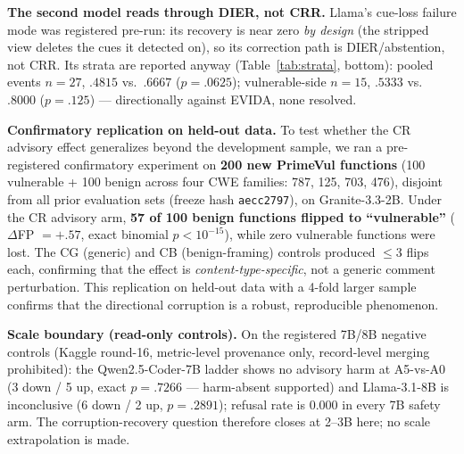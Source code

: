 \documentclass[sigconf,nonacm]{acmart}
\begin{document}
\textbf{The second model reads through DIER, not CRR.} Llama's cue-loss
failure mode was registered pre-run: its recovery is near zero \emph{by
design} (the stripped view deletes the cues it detected on), so its
correction path is DIER/abstention, not CRR. Its strata are reported
anyway (Table~\ref{tab:strata}, bottom): pooled events $n{=}27$,
$.4815$ vs.\ $.6667$ ($p{=}.0625$); vulnerable-side $n{=}15$, $.5333$
vs.\ $.8000$ ($p{=}.125$) --- directionally against EVIDA, none
resolved.

\textbf{Confirmatory replication on held-out data.} To test whether the
CR advisory effect generalizes beyond the development sample, we ran a
pre-registered confirmatory experiment on \textbf{200 new PrimeVul
functions} (100 vulnerable + 100 benign across four CWE families:
787, 125, 703, 476), disjoint from all prior evaluation sets
(freeze hash \texttt{aecc2797}), on Granite-3.3-2B. Under the CR
advisory arm, \textbf{57 of 100 benign functions flipped to
``vulnerable''} ($\Delta$FP $= +.57$, exact binomial $p < 10^{-15}$),
while zero vulnerable functions were lost. The CG (generic) and CB
(benign-framing) controls produced ${\le}3$ flips each, confirming
that the effect is \emph{content-type-specific}, not a generic
comment perturbation. This replication on held-out data with a
4-fold larger sample confirms that the directional corruption is a
robust, reproducible phenomenon.

\textbf{Scale boundary (read-only controls).} On the registered 7B/8B
negative controls (Kaggle round-16, metric-level provenance only,
record-level merging prohibited): the Qwen2.5-Coder-7B ladder shows no
advisory harm at A5-vs-A0 (3 down / 5 up, exact $p{=}.7266$ ---
harm-absent supported) and Llama-3.1-8B is inconclusive (6 down / 2 up,
$p{=}.2891$); refusal rate is $0.000$ in every 7B safety arm. The
corruption-recovery question therefore closes at 2--3B here; no scale
extrapolation is made.
\end{document}
